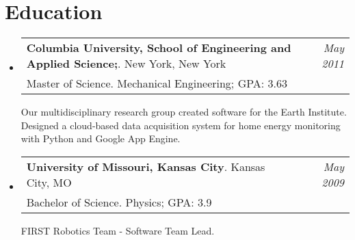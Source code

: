\documentclass[letterpaper,11pt]{article}
\makeatletter
\newcommand{\resumeSubheading}[4]{
  \vspace{-2pt} %
  \item
    \begin{tabular*}{0.97\textwidth}{l@{\extracolsep{\fill}}r}
      \textbf{#1}. #2 & \textit{\small#4} \\
       {\small #3} \\

    \end{tabular*}
    \vspace{-5pt}
}
\newcommand{\resumeSubHeadingListStart}{\begin{itemize}[leftmargin=*]}
\newcommand{\resumeSubHeadingListEnd}{\end{itemize}}
\makeatother
\begin{document}
\section{Education}
\resumeSubHeadingListStart
  \resumeSubheading
    {Columbia University, School of Engineering and Applied Science;}{New York, New York}
    {Master of Science. Mechanical Engineering;  GPA: 3.63}{May 2011}
    {Our multidisciplinary research group created software for the Earth Institute. Designed a cloud-based data acquisition system for home energy monitoring with Python and Google App Engine.}
    \resumeSubheading
    {University of Missouri, Kansas City}{Kansas City, MO}
    {Bachelor of Science. Physics;  GPA: 3.9}{May 2009}
    {FIRST Robotics Team - Software Team Lead.}
    \resumeSubHeadingListEnd


%


\end{document}
